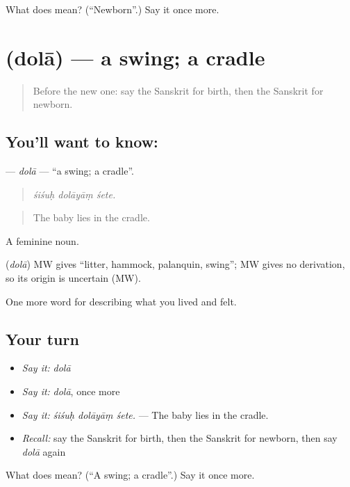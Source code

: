 \begin{tcolorbox}[breakable,colback=teal!4,colframe=teal!35!black,title={Before you move on}]
What does  mean? (\textquotedblleft{}Newborn\textquotedblright{}.) Say it once more.
\end{tcolorbox}
\section[\texorpdfstring{\sk{दोला} (dolā)}{दोला (dolā)}]{ (dolā) — a swing; a cradle}

\label{lesson:SA-C492-dola}



\begin{quote}
Before the new one: say the Sanskrit for birth, then the Sanskrit for newborn.
\end{quote}

\subsection*{You'll want to know: }
\textbf{} — \emph{dolā} — \textquotedblleft{}a swing; a cradle\textquotedblright{}.

\begin{quote}
  
\end{quote}

\begin{quote}
\emph{śiśuḥ dolāyāṃ śete.}
\end{quote}

\begin{quote}
The baby lies in the cradle.
\end{quote}

A feminine noun.

\begin{cousinweb}
\textbf{} (\emph{dolā}) MW gives \textquotedblleft{}litter, hammock, palanquin, swing\textquotedblright{}; MW gives no derivation, so its origin is uncertain (MW).
\end{cousinweb}

\begin{grammarlens}[title={What you've built}]
One more word for describing what you lived and felt.
\end{grammarlens}

\subsection*{Your turn}
\begin{itemize}
\raggedright
  \item \emph{Say it:} \emph{dolā}
  \item \emph{Say it:} \emph{dolā}, once more
  \item \emph{Say it:} \emph{śiśuḥ dolāyāṃ śete.} — The baby lies in the cradle.
  \item \emph{Recall:} say the Sanskrit for birth, then the Sanskrit for newborn, then say \emph{dolā} again
\end{itemize}

\begin{tcolorbox}[breakable,colback=teal!4,colframe=teal!35!black,title={Before you move on}]
What does  mean? (\textquotedblleft{}A swing; a cradle\textquotedblright{}.) Say it once more.
\end{tcolorbox}

